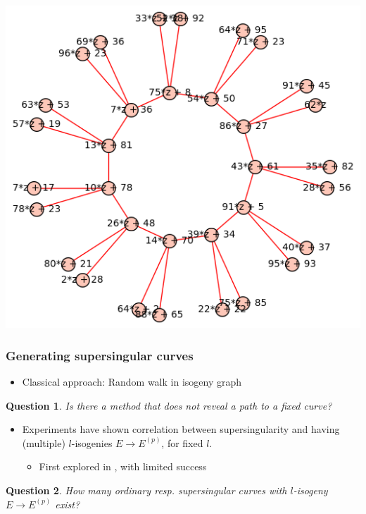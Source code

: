 \documentclass{beamer}
\newtheorem{question}{Question}
\begin{document}
\begin{frame}
\begin{minipage}{0.49\textwidth}
        \includegraphics[width = \textwidth]{./example_odd_crater.png}
    \end{minipage}
\end{frame}

\begin{frame}
    \frametitle{Generating supersingular curves}

    \begin{itemize}
        \item Classical approach: Random walk in isogeny graph
    \end{itemize}
    \begin{question}
        Is there a method that does not reveal a path to a fixed curve?
    \end{question}
    \begin{itemize}
        \item Experiments have shown correlation between supersingularity and having (multiple) $l$-isogenies $E \to E^{(p)}$, for fixed $l$.
        \begin{itemize}
            \item First explored in \cite{base_paper}, with limited success
        \end{itemize}
    \end{itemize}
    \begin{question}
        How many ordinary resp. supersingular curves with $l$-isogeny $E \to E^{(p)}$ exist?
    \end{question}
\end{frame}
\end{document}
